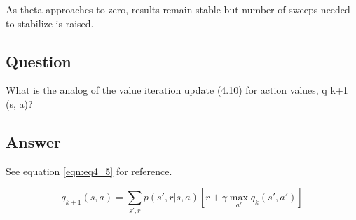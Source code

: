 \documentclass[11pt]{article}
\begin{document}
    As theta approaches to zero, results remain stable but number of sweeps needed to stabilize is raised.

    \subsection{Question}

    What is the analog of the value iteration update (4.10) for action values, q k+1 (s, a)?

    \subsection*{Answer}

    See equation \ref{eqn:eq4_5} for reference.

    \begin{equation}
        q_{k+1}(s, a) = \sum_{s',r} p(s', r | s, a) [r + \gamma \max_{a'} q_k(s', a')]
    \end{equation}
\end{document}
